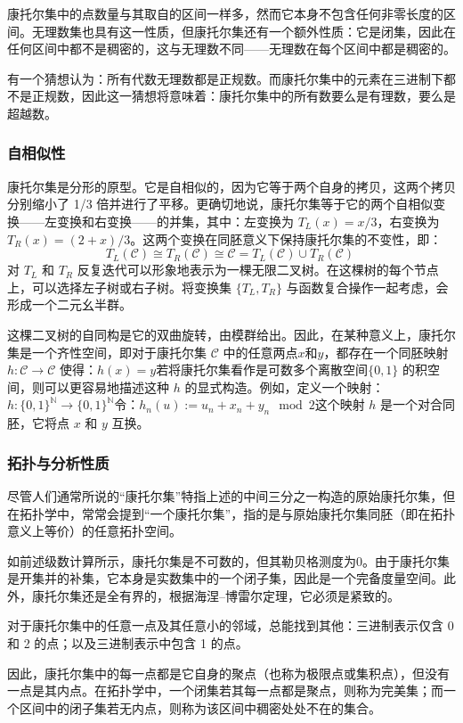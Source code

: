 康托尔集中的点数量与其取自的区间一样多，然而它本身不包含任何非零长度的区间。无理数集也具有这一性质，但康托尔集还有一个额外性质：它是闭集，因此在任何区间中都不是稠密的，这与无理数不同——无理数在每个区间中都是稠密的。

有一个猜想认为：所有代数无理数都是正规数。而康托尔集中的元素在三进制下都不是正规数，因此这一猜想将意味着：康托尔集中的所有数要么是有理数，要么是超越数。
\subsubsection{自相似性}
康托尔集是分形的原型。它是自相似的，因为它等于两个自身的拷贝，这两个拷贝分别缩小了 1/3 倍并进行了平移。更确切地说，康托尔集等于它的两个自相似变换——左变换和右变换——的并集，其中：左变换为 $T_L(x) = x/3$，右变换为 $T_R(x) = (2 + x)/3$。这两个变换在同胚意义下保持康托尔集的不变性，即：
$$
T_L(\mathcal{C}) \cong T_R(\mathcal{C}) \cong \mathcal{C} = T_L(\mathcal{C}) \cup T_R(\mathcal{C})~
$$
对 $T_L$ 和 $T_R$ 反复迭代可以形象地表示为一棵无限二叉树。在这棵树的每个节点上，可以选择左子树或右子树。将变换集 $\{T_L, T_R\}$ 与函数复合操作一起考虑，会形成一个二元幺半群。

这棵二叉树的自同构是它的双曲旋转，由模群给出。因此，在某种意义上，康托尔集是一个齐性空间，即对于康托尔集 $\mathcal{C}$ 中的任意两点$x$和$y$，都存在一个同胚映射$h: \mathcal{C} \to \mathcal{C}$ 使得：$h(x) = y$若将康托尔集看作是可数多个离散空间$\{0,1\}$ 的积空间，则可以更容易地描述这种 $h$ 的显式构造。例如，定义一个映射：$h: \{0,1\}^{\mathbb{N}} \to \{0,1\}^{\mathbb{N}}$令：$h_n(u) := u_n + x_n + y_n \mod 2$这个映射 $h$ 是一个对合同胚，它将点 $x$ 和 $y$ 互换。
\subsubsection{拓扑与分析性质}
尽管人们通常所说的“康托尔集”特指上述的中间三分之一构造的原始康托尔集，但在拓扑学中，常常会提到“一个康托尔集”，指的是与原始康托尔集同胚（即在拓扑意义上等价）的任意拓扑空间。

如前述级数计算所示，康托尔集是不可数的，但其勒贝格测度为0。由于康托尔集是开集并的补集，它本身是实数集中的一个闭子集，因此是一个完备度量空间。此外，康托尔集还是全有界的，根据海涅–博雷尔定理，它必须是紧致的。

对于康托尔集中的任意一点及其任意小的邻域，总能找到其他：三进制表示仅含 0 和 2 的点；以及三进制表示中包含 1 的点。

因此，康托尔集中的每一点都是它自身的聚点（也称为极限点或集积点），但没有一点是其内点。在拓扑学中，一个闭集若其每一点都是聚点，则称为完美集；而一个区间中的闭子集若无内点，则称为该区间中稠密处处不在的集合。

